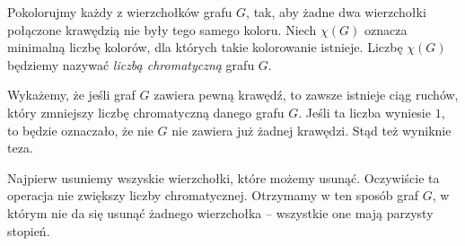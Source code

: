 
\noindent
Pokolorujmy każdy z wierzchołków grafu $G$, tak, aby żadne dwa wierzchołki połączone krawędzią nie były tego samego koloru.
Niech $\chi(G)$ oznacza minimalną liczbę kolorów, dla których takie kolorowanie istnieje. Liczbę $\chi(G)$ będziemy nazywać \textit{liczbą chromatyczną} grafu $G$.

\vspace{10px}
\noindent
Wykażemy, że jeśli graf $G$ zawiera pewną krawędź, to zawsze istnieje ciąg ruchów, który zmniejszy liczbę chromatyczną danego grafu $G$. Jeśli ta liczba wyniesie $1$, to będzie oznaczało, że nie $G$ nie zawiera już żadnej krawędzi. Stąd też wyniknie teza.

\vspace{10px}
\noindent
Najpierw usuniemy wszyskie wierzchołki, które możemy usunąć. Oczywiście ta operacja nie zwiększy liczby chromatycznej. Otrzymamy w ten sposób graf $G$, w którym nie da się usunąć żadnego wierzchołka -- wszystkie one mają parzysty stopień.

